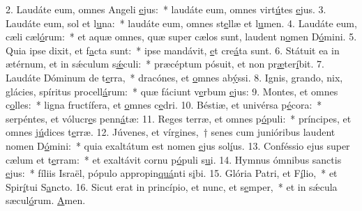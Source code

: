 2. Laudáte eum, omnes Angeli \uline{e}jus:~* laudáte eum, omnes virt\uline{ú}tes \uline{e}jus.
3. Laudáte eum, sol et l\uline{u}na:~* laudáte eum, omnes st\uline{e}llæ et l\uline{u}men.
4. Laudáte eum, cæli cæl\uline{ó}rum:~* et aquæ omnes, quæ super cælos sunt, laudent n\uline{o}men D\uline{ó}mini.
5. Quia ipse dixit, et f\uline{a}cta sunt:~* ipse mandávit, \uline{e}t cre\uline{á}ta sunt.
6. Státuit ea in ætérnum, et in sǽculum s\uline{ǽ}culi:~* præcéptum pósuit, et non pr\uline{æ}ter\uline{í}bit.
7. Laudáte Dóminum de t\uline{e}rra,~* dracónes, et \uline{o}mnes ab\uline{ý}ssi.
8. Ignis, grando, nix, glácies, spíritus procell\uline{á}rum:~* quæ fáciunt v\uline{e}rbum \uline{e}jus:
9. Montes, et omnes c\uline{o}lles:~* ligna fructífera, et \uline{o}mnes c\uline{e}dri.
10. Béstiæ, et univérsa p\uline{é}cora:~* serpéntes, et vólucr\uline{e}s penn\uline{á}tæ:
11. Reges terræ, et omnes p\uline{ó}puli:~* príncipes, et omnes j\uline{ú}dices t\uline{e}rræ.
12. Júvenes, et vírgines,~† senes cum junióribus laudent nomen D\uline{ó}mini:~* quia exaltátum est nomen \uline{e}jus sol\uline{í}us.
13. Conféssio ejus super cælum et t\uline{e}rram:~* et exaltávit cornu p\uline{ó}puli s\uline{u}i.
14. Hymnus ómnibus sanctis \uline{e}jus:~* fíliis Israël, pópulo appropin\uline{quá}nti s\uline{i}bi.
15. Glória Patri, et F\uline{í}lio,~* et Spir\uline{í}tui S\uline{a}ncto.
16. Sicut erat in princípio, et nunc, et s\uline{e}mper,~* et in sǽcula sæcul\uline{ó}rum. \uline{A}men.
